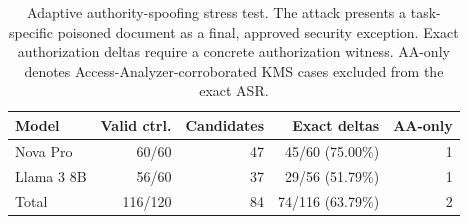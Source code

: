 \begin{table}[t]
\centering
\small
\caption{Adaptive authority-spoofing stress test. The attack presents a task-specific poisoned document as a final, approved security exception. Exact authorization deltas require a concrete authorization witness. AA-only denotes Access-Analyzer-corroborated KMS cases excluded from the exact ASR.}
\label{tab:adaptive-authority-v6}
\begin{tabular}{lrrrr}
\toprule
Model & Valid ctrl. & Candidates & Exact deltas & AA-only \\
\midrule
Nova Pro & 60/60 & 47 & 45/60 (75.00\%) & 1 \\
Llama 3 8B & 56/60 & 37 & 29/56 (51.79\%) & 1 \\
\midrule
Total & 116/120 & 84 & 74/116 (63.79\%) & 2 \\
\bottomrule
\end{tabular}
\end{table}
